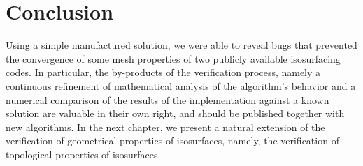 \section{Conclusion}

Using a simple manufactured solution, 
we were able to reveal bugs that prevented the convergence of 
some mesh properties of two publicly available isosurfacing codes.
In particular, the by-products of the verification process, namely
a continuous refinement of mathematical analysis of the algorithm's
behavior and a numerical comparison of the results of the 
implementation against a known solution are valuable in their own right, 
and should be published together with new algorithms.
%
In the next chapter, we present a natural extension of the verification of geometrical properties of isosurfaces, namely, the verification of topological properties of isosurfaces.


